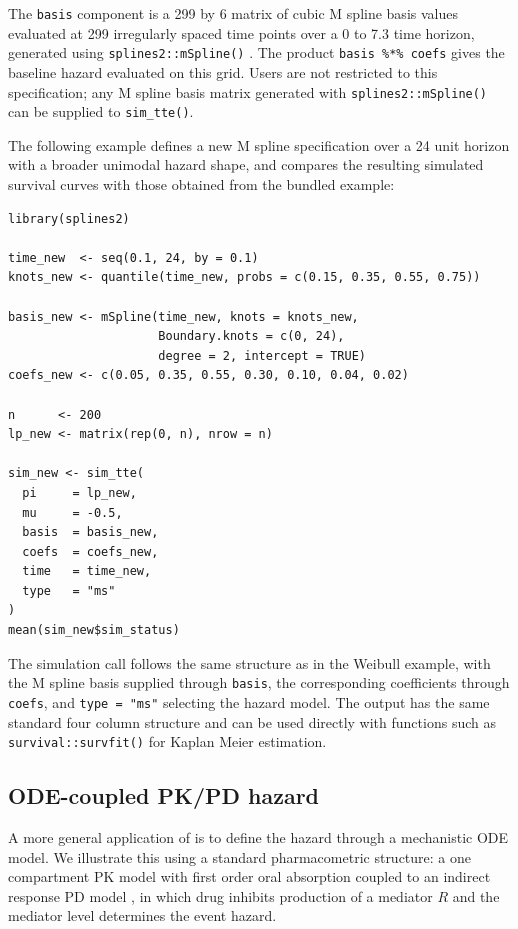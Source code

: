 The \texttt{basis} component is a 299 by 6 matrix of cubic M spline basis values evaluated at 299 irregularly spaced time points over a 0 to 7.3 time horizon, generated using \texttt{splines2::mSpline()} \citep{splines2}. The product \texttt{basis\ \%*\%\ coefs} gives the baseline hazard evaluated on this grid. Users are not restricted to this specification; any M spline basis matrix generated with \texttt{splines2::mSpline()} can be supplied to \texttt{sim\_tte()}.

The following example defines a new M spline specification over a 24 unit horizon with a broader unimodal hazard shape, and compares the resulting simulated survival curves with those obtained from the bundled example:

\begin{verbatim}
library(splines2)

time_new  <- seq(0.1, 24, by = 0.1)
knots_new <- quantile(time_new, probs = c(0.15, 0.35, 0.55, 0.75))

basis_new <- mSpline(time_new, knots = knots_new,
                     Boundary.knots = c(0, 24),
                     degree = 2, intercept = TRUE)
coefs_new <- c(0.05, 0.35, 0.55, 0.30, 0.10, 0.04, 0.02)

n      <- 200
lp_new <- matrix(rep(0, n), nrow = n)

sim_new <- sim_tte(
  pi     = lp_new,
  mu     = -0.5,
  basis  = basis_new,
  coefs  = coefs_new,
  time   = time_new,
  type   = "ms"
)
mean(sim_new$sim_status)
\end{verbatim}

The simulation call follows the same structure as in the Weibull example, with the M spline basis supplied through \texttt{basis}, the corresponding coefficients through \texttt{coefs}, and \texttt{type\ =\ "ms"} selecting the hazard model. The output has the same standard four column structure and can be used directly with functions such as \texttt{survival::survfit()} for Kaplan Meier estimation.

\subsection{ODE-coupled PK/PD hazard}\label{pkpd-section}

A more general application of  is to define the hazard through a mechanistic ODE model. We illustrate this using a standard pharmacometric structure: a one compartment PK model with first order oral absorption coupled to an indirect response PD model \citep{dayneka1993}, in which drug inhibits production of a mediator \(R\) and the mediator level determines the event hazard.

